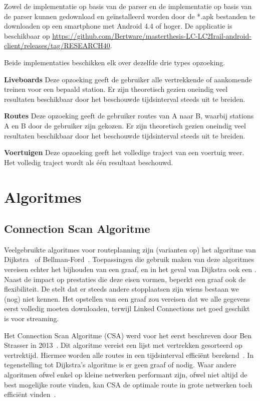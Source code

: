 Zowel de implementatie op basis van de  parser en de implementatie op basis van de  parser kunnen gedownload en geïnstalleerd worden door de *.apk bestanden te downloaden op een smartphone met Android 4.4 of hoger. De applicatie is beschikbaar op \url{https://github.com/Bertware/masterthesis-LC-LC2Irail-android-client/releases/tag/RESEARCH40}.

Beide implementaties beschikken elk over dezelfde drie types opzoeking.

\textbf{Liveboards} Deze opzoeking geeft de gebruiker alle vertrekkende of aankomende treinen voor een bepaald station. Er zijn theoretisch gezien oneindig veel resultaten beschikbaar door het beschouwde tijdsinterval steeds uit te breiden.

\textbf{Routes} Deze opzoeking geeft de gebruiker routes van A naar B, waarbij stations A en B door de gebruiker zijn gekozen. Er zijn theoretisch gezien oneindig veel resultaten beschikbaar door het beschouwde tijdsinterval steeds uit te breiden.

\textbf{Voertuigen} Deze opzoeking geeft het volledige traject van een voertuig weer. Het volledig traject wordt als één resultaat beschouwd.

\section{Algoritmes}
\label{sec:algoritmes}
\subsection{Connection Scan Algoritme}
\label{sec:csa}
Veelgebruikte algoritmes voor routeplanning zijn (varianten op) het algoritme van Dijkstra~\citep{Dijkstra59, strasser13,hannemann07,hannemann08} of Bellman-Ford~\citep{Bellmanford58}. Toepassingen die gebruik maken van deze algoritmes vereisen echter het bijhouden van een graaf, en in het geval van Dijkstra ook een . Naast de impact op prestaties die deze eisen vormen, beperkt een graaf ook de flexibiliteit. De  stelt dat er steeds andere stopplaatsen zijn wiens bestaan we (nog) niet kennen. Het opstellen van een graaf zou vereisen dat we alle gegevens eerst volledig moeten downloaden, terwijl Linked Connections net goed geschikt is voor streaming. 

Het Connection Scan Algoritme (CSA) werd voor het eerst beschreven door Ben Strasser in 2013~\citep{strasser13}. Dit algoritme vereist een lijst met vertrekken gesorteerd op vertrektijd. Hiermee worden alle routes in een tijdsinterval efficiënt berekend~\citep{strasser14,strasser17}. In tegenstelling tot Dijkstra's algoritme is er geen graaf of  nodig. Waar andere algoritmen ofwel enkel op kleine netwerken performant zijn, ofwel niet altijd de best mogelijke route vinden, kan CSA de optimale route in grote netwerken toch efficiënt vinden~\citep{strasser14}.

